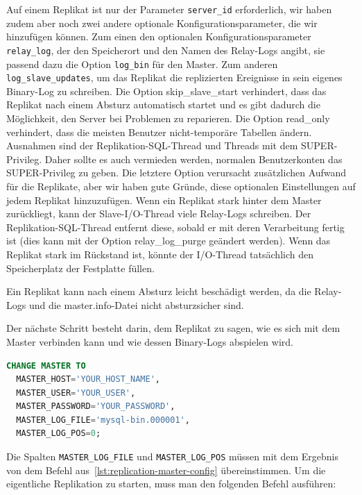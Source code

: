Auf einem Replikat ist nur der Parameter \texttt{server\_id} erforderlich, wir haben zudem aber noch zwei andere optionale Konfigurationsparameter, die wir hinzufügen können.
Zum einen den optionalen Konfigurationsparameter \texttt{relay\_log}, der den Speicherort und den Namen des Relay-Logs angibt, sie passend dazu die Option \texttt{log\_bin} für den Master.
Zum anderen \texttt{log\_slave\_updates}, um das Replikat die replizierten Ereignisse in sein eigenes Binary-Log zu schreiben.
Die Option skip\_slave\_start verhindert, dass das Replikat nach einem Absturz automatisch startet und es gibt dadurch die Möglichkeit, den Server bei Problemen zu reparieren.
Die Option read\_only verhindert, dass die meisten Benutzer nicht-temporäre Tabellen ändern.
Ausnahmen sind der Replikation-SQL-Thread und Threads mit dem SUPER-Privileg.
Daher sollte es auch vermieden werden, normalen Benutzerkonten das SUPER-Privileg zu geben.
Die letztere Option verursacht zusätzlichen Aufwand für die Replikate, aber wir haben gute Gründe, diese optionalen Einstellungen auf jedem Replikat hinzuzufügen.
Wenn ein Replikat stark hinter dem Master zurückliegt, kann der Slave-I/O-Thread viele Relay-Logs schreiben.
Der Replikation-SQL-Thread entfernt diese, sobald er mit deren Verarbeitung fertig ist (dies kann mit der Option relay\_log\_purge geändert werden).
Wenn das Replikat stark im Rückstand ist, könnte der I/O-Thread tatsächlich den Speicherplatz der Festplatte füllen.

Ein Replikat kann nach einem Absturz leicht beschädigt werden, da die Relay-Logs und die master.info-Datei nicht absturzsicher sind.

Der nächste Schritt besteht darin, dem Replikat zu sagen, wie es sich mit dem Master verbinden kann und wie dessen Binary-Logs abspielen wird.

\vspace{-8pt}
\begin{lstlisting}[language=SQL,caption=Verbindung der Replica zum Master,label={lst:replication-connection-replica-master}]
CHANGE MASTER TO
  MASTER_HOST='YOUR_HOST_NAME',
  MASTER_USER='YOUR_USER',
  MASTER_PASSWORD='YOUR_PASSWORD',
  MASTER_LOG_FILE='mysql-bin.000001',
  MASTER_LOG_POS=0;
\end{lstlisting}
\vspace{-5pt}

Die Spalten \texttt{MASTER\_LOG\_FILE} und \texttt{MASTER\_LOG\_POS} müssen mit dem Ergebnis von dem Befehl aus~\ref{lst:replication-master-config} übereinstimmen.
Um die eigentliche Replikation zu starten, muss man den folgenden Befehl ausführen:

